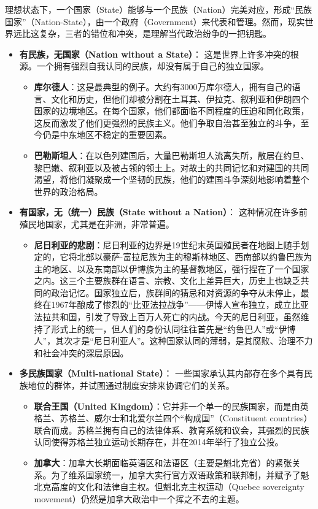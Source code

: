 理想状态下，一个国家（State）能够与一个民族（Nation）完美对应，形成“民族国家”（Nation-State），由一个政府（Government）来代表和管理。然而，现实世界远比这复杂，三者的错位和冲突，是理解当代政治纷争的一把钥匙。

\begin{itemize}[noitemsep,topsep=0pt]
    \item \textbf{有民族，无国家（Nation without a State）}：
    这是世界上许多冲突的根源。一个拥有强烈自我认同的民族，却没有属于自己的独立国家。
    \begin{itemize}[noitemsep,topsep=0pt]
        \item \textbf{库尔德人}：这是最典型的例子。大约有3000万库尔德人，拥有自己的语言、文化和历史，但他们却被分割在土耳其、伊拉克、叙利亚和伊朗四个国家的边境地区。在每个国家，他们都面临不同程度的压迫和同化政策，这反而激发了他们更强烈的民族主义。他们争取自治甚至独立的斗争，至今仍是中东地区不稳定的重要因素。
        \item \textbf{巴勒斯坦人}：在以色列建国后，大量巴勒斯坦人流离失所，散居在约旦、黎巴嫩、叙利亚以及被占领的领土上。对故土的共同记忆和对建国的共同渴望，将他们凝聚成一个坚韧的民族，他们的建国斗争深刻地影响着整个世界的政治格局。
    \end{itemize}
    \item \textbf{有国家，无（统一）民族（State without a Nation）}：
    这种情况在许多前殖民地国家，尤其是在非洲，非常普遍。
    \begin{itemize}[noitemsep,topsep=0pt]
        \item \textbf{尼日利亚的悲剧}：尼日利亚的边界是19世纪末英国殖民者在地图上随手划定的，它将北部以豪萨-富拉尼族为主的穆斯林地区、西南部以约鲁巴族为主的地区、以及东南部以伊博族为主的基督教地区，强行捏在了一个国家之内。这三个主要族群在语言、宗教、文化上差异巨大，历史上也缺乏共同的政治记忆。国家独立后，族群间的猜忌和对资源的争夺从未停止，最终在1967年酿成了惨烈的“比亚法拉战争”——伊博人宣布独立，成立比亚法拉共和国，引发了导致上百万人死亡的内战。今天的尼日利亚，虽然维持了形式上的统一，但人们的身份认同往往首先是“约鲁巴人”或“伊博人”，其次才是“尼日利亚人”。这种国家认同的薄弱，是其腐败、治理不力和社会冲突的深层原因。
    \end{itemize}
    \item \textbf{多民族国家（Multi-national State）}：
    一些国家承认其内部存在多个具有民族地位的群体，并试图通过制度安排来协调它们的关系。
    \begin{itemize}[noitemsep,topsep=0pt]
        \item \textbf{联合王国（United Kingdom）}：它并非一个单一的民族国家，而是由英格兰、苏格兰、威尔士和北爱尔兰四个“构成国”（Constituent countries）联合而成。苏格兰拥有自己的法律体系、教育系统和议会，其强烈的民族认同使得苏格兰独立运动长期存在，并在2014年举行了独立公投。
        \item \textbf{加拿大}：加拿大长期面临英语区和法语区（主要是魁北克省）的紧张关系。为了维系国家统一，加拿大实行官方双语政策和联邦制，并赋予了魁北克高度的文化和法律自主权。但魁北克主权运动（Quebec sovereignty movement）仍然是加拿大政治中一个挥之不去的主题。
    \end{itemize}
\end{itemize}

